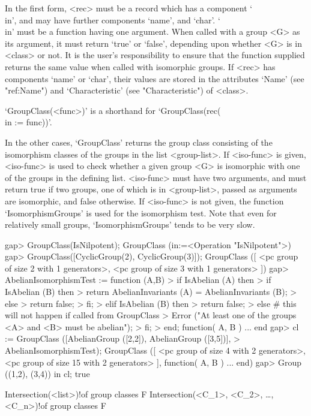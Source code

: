 In the first form, <rec> must be a record which has a component `\\in', and may have
further components `name', and  `char'. `\\in' must be a function having one argument.
When called with a group <G> as its argument, it must return `true' or `false',
depending upon whether <G> is in <class> or not. It is the user's
responsibility to ensure that the function supplied returns the same value
when called with isomorphic groups. If <rec> has components  `name' or 
`char', their values are stored in the attributes `Name' (see "ref:Name")
and `Characteristic' (see "Characteristic") of <class>.

`GroupClass(<func>)' is a shorthand for `GroupClass(rec(\\in := func))'.

In the other cases, `GroupClass' returns the group
class consisting of the isomorphism classes of the groups in the list
<group-list>. If <iso-func> is
given, <iso-func> is used to check whether a given group <G> is isomorphic
with one of the groups in the defining list. <iso-func> must have two
arguments, and must return true if two groups, one of which is in
<group-list>, passed as arguments are isomorphic, and false otherwise. If
<iso-func> is not given, the {\GAP} function `IsomorphismGroups' is used for
the isomorphism test. Note that even for relatively small groups,
`IsomorphismGroups' tends to be very slow. 


\beginexample
gap> GroupClass(IsNilpotent);
GroupClass (in:=<Operation "IsNilpotent">)
gap> GroupClass([CyclicGroup(2), CyclicGroup(3)]);
GroupClass ([ <pc group of size 2 with 1 generators>, 
  <pc group of size 3 with 1 generators> ])
gap> AbelianIsomorphismTest := function (A,B)
>     if IsAbelian (A) then
>         if IsAbelian (B) then
>             return AbelianInvariants (A) = AbelianInvariants (B);
>         else
>             return false;
>         fi;
>     elif IsAbelian (B) then
>         return false;
>     else # this will not happen if called from GroupClass
>         Error ("At least one of the groups <A> and <B> must be abelian");
>     fi;
> end;
function( A, B ) ... end
gap> cl := GroupClass ([AbelianGroup ([2,2]), AbelianGroup ([3,5])],
> AbelianIsomorphismTest);
GroupClass ([ <pc group of size 4 with 2 generators>, 
  <pc group of size 15 with 2 generators> ], function( A, B ) ... end)
gap> Group ((1,2), (3,4)) in cl;
true
\endexample


\>Intersection(<list>)!{of group classes} F
\>Intersection(<C_1>, <C_2>, \dots, <C_n>)!{of group classes} F

